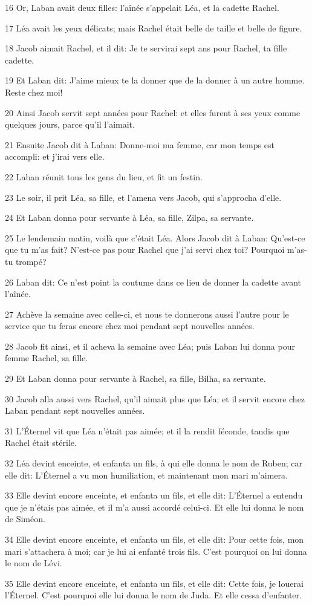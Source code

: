 \par 16 Or, Laban avait deux filles: l'aînée s'appelait Léa, et la cadette Rachel.
\par 17 Léa avait les yeux délicats; mais Rachel était belle de taille et belle de figure.
\par 18 Jacob aimait Rachel, et il dit: Je te servirai sept ans pour Rachel, ta fille cadette.
\par 19 Et Laban dit: J'aime mieux te la donner que de la donner à un autre homme. Reste chez moi!
\par 20 Ainsi Jacob servit sept années pour Rachel: et elles furent à ses yeux comme quelques jours, parce qu'il l'aimait.
\par 21 Ensuite Jacob dit à Laban: Donne-moi ma femme, car mon temps est accompli: et j'irai vers elle.
\par 22 Laban réunit tous les gens du lieu, et fit un festin.
\par 23 Le soir, il prit Léa, sa fille, et l'amena vers Jacob, qui s'approcha d'elle.
\par 24 Et Laban donna pour servante à Léa, sa fille, Zilpa, sa servante.
\par 25 Le lendemain matin, voilà que c'était Léa. Alors Jacob dit à Laban: Qu'est-ce que tu m'as fait? N'est-ce pas pour Rachel que j'ai servi chez toi? Pourquoi m'as-tu trompé?
\par 26 Laban dit: Ce n'est point la coutume dans ce lieu de donner la cadette avant l'aînée.
\par 27 Achève la semaine avec celle-ci, et nous te donnerons aussi l'autre pour le service que tu feras encore chez moi pendant sept nouvelles années.
\par 28 Jacob fit ainsi, et il acheva la semaine avec Léa; puis Laban lui donna pour femme Rachel, sa fille.
\par 29 Et Laban donna pour servante à Rachel, sa fille, Bilha, sa servante.
\par 30 Jacob alla aussi vers Rachel, qu'il aimait plus que Léa; et il servit encore chez Laban pendant sept nouvelles années.
\par 31 L'Éternel vit que Léa n'était pas aimée; et il la rendit féconde, tandis que Rachel était stérile.
\par 32 Léa devint enceinte, et enfanta un fils, à qui elle donna le nom de Ruben; car elle dit: L'Éternel a vu mon humiliation, et maintenant mon mari m'aimera.
\par 33 Elle devint encore enceinte, et enfanta un fils, et elle dit: L'Éternel a entendu que je n'étais pas aimée, et il m'a aussi accordé celui-ci. Et elle lui donna le nom de Siméon.
\par 34 Elle devint encore enceinte, et enfanta un fils, et elle dit: Pour cette fois, mon mari s'attachera à moi; car je lui ai enfanté trois fils. C'est pourquoi on lui donna le nom de Lévi.
\par 35 Elle devint encore enceinte, et enfanta un fils, et elle dit: Cette fois, je louerai l'Éternel. C'est pourquoi elle lui donna le nom de Juda. Et elle cessa d'enfanter.

